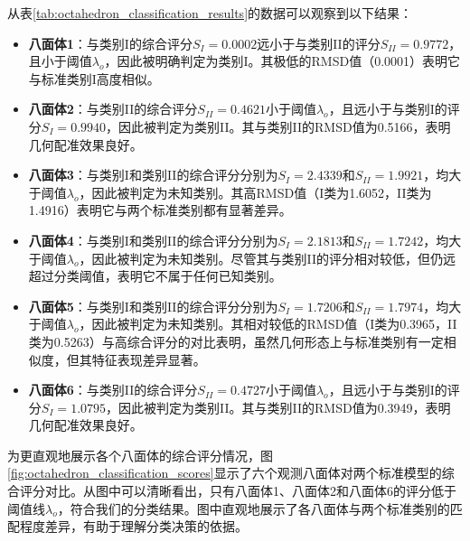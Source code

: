 从表\ref{tab:octahedron_classification_results}的数据可以观察到以下结果：

\begin{itemize}
\item \textbf{八面体1}：与类别I的综合评分$S_I = 0.0002$远小于与类别II的评分$S_{II} = 0.9772$，且小于阈值$\lambda_o$，因此被明确判定为类别I。其极低的RMSD值（0.0001）表明它与标准类别I高度相似。

\item \textbf{八面体2}：与类别II的综合评分$S_{II} = 0.4621$小于阈值$\lambda_o$，且远小于与类别I的评分$S_I = 0.9940$，因此被判定为类别II。其与类别II的RMSD值为0.5166，表明几何配准效果良好。

\item \textbf{八面体3}：与类别I和类别II的综合评分分别为$S_I = 2.4339$和$S_{II} = 1.9921$，均大于阈值$\lambda_o$，因此被判定为未知类别。其高RMSD值（I类为1.6052，II类为1.4916）表明它与两个标准类别都有显著差异。

\item \textbf{八面体4}：与类别I和类别II的综合评分分别为$S_I = 2.1813$和$S_{II} = 1.7242$，均大于阈值$\lambda_o$，因此被判定为未知类别。尽管其与类别II的评分相对较低，但仍远超过分类阈值，表明它不属于任何已知类别。

\item \textbf{八面体5}：与类别I和类别II的综合评分分别为$S_I = 1.7206$和$S_{II} = 1.7974$，均大于阈值$\lambda_o$，因此被判定为未知类别。其相对较低的RMSD值（I类为0.3965，II类为0.5263）与高综合评分的对比表明，虽然几何形态上与标准类别有一定相似度，但其特征表现差异显著。

\item \textbf{八面体6}：与类别II的综合评分$S_{II} = 0.4727$小于阈值$\lambda_o$，且远小于与类别I的评分$S_I = 1.0795$，因此被判定为类别II。其与类别II的RMSD值为0.3949，表明几何配准效果良好。
\end{itemize}

为更直观地展示各个八面体的综合评分情况，图\ref{fig:octahedron_classification_scores}显示了六个观测八面体对两个标准模型的综合评分对比。从图中可以清晰看出，只有八面体1、八面体2和八面体6的评分低于阈值线$\lambda_o$，符合我们的分类结果。图中直观地展示了各八面体与两个标准类别的匹配程度差异，有助于理解分类决策的依据。

